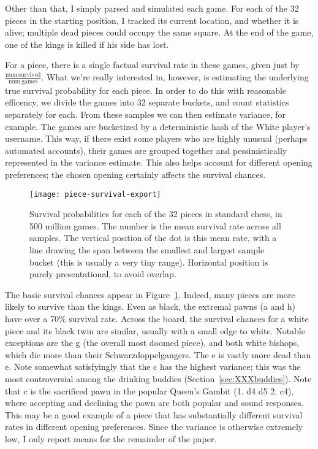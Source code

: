 \documentclass[twocolumn]{article}
\newcommand{\Pawn}[1][1.3ex]{%
\adjustbox{Trim=4.3pt 2.6pt 4.3pt 0pt,width=#1,margin=0.2ex 0ex 0.2ex 0ex}{\BlackPawnOnWhite}%
}%
\begin{document}
Other than that, I simply parsed and simulated each game. For each
of the 32 pieces in the starting position, I tracked its current
location, and whether it is alive; multiple dead pieces could
occupy the same square. At the end of the game, one of the kings is
killed if his side has lost.

For a piece, there is a single factual survival rate in these games,
given just by $\frac{\mathrm{num~survived}}{\mathrm{num~games}}$. What
we're really interested in, however, is estimating the underlying true
survival probability for each piece. In order to do this with
reasonable efficency, we divide the games into 32 separate buckets,
and count statistics separately for each. From these samples we can
then estimate variance, for example. The games are bucketized by a
deterministic hash of the White player's username. This way, if there
exist some players who are highly unusual (perhaps automated
accounts), their games are grouped together and pessimistically
represented in the variance estimate. This also helps account for
different opening preferences; the chosen opening certainly affects
the survival chances.

\begin{figure}[htb]
  \begin{center}
    \texttt{[image: piece-survival-export]}
  \end{center}\vspace{-0.1in}
  \caption{Survival probabilities for each of the 32 pieces in standard
    chess, in 500 million games. The number is the mean survival rate
    across all samples. The vertical position of the dot is this mean
    rate, with a line drawing the span between the smallest and largest
    sample bucket (this is usually a very tiny range).
    Horizontal position is purely presentational, to avoid overlap.}
  \label{fig:piece-survival}
\end{figure}

The basic survival chances appear in Figure~\ref{fig:piece-survival}.
Indeed, many pieces are more likely to survive than the kings. Even as
black, the extremal pawns (\pawn a and \pawn h) have over a 70\%
survival rate. Across the board, the survival chances for a white
piece and its black twin are similar, usually with a small edge to
white. Notable exceptions are the \knight g (the overall most doomed
piece), and both white bishops, which die more than their
Schwarzdoppelgangers. The \pawn e is vastly more dead than \Pawn e.
Note somewhat satisfyingly that the \pawn c has the highest variance;
this was the most controversial among the drinking buddies
(Section~\ref{sec:XXXbuddies}). Note that \pawn c is the sacrificed
pawn in the popular Queen's Gambit (1. d4 d5 2. c4), where accepting
and declining the pawn are both popular and sound responses. This may
be a good example of a piece that has substantially different survival
rates in different opening preferences. Since the variance is
otherwise extremely low, I only report means for the remainder of the
paper.
\end{document}
